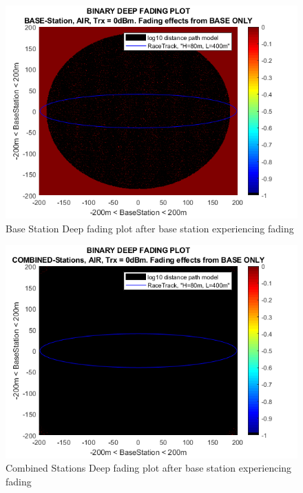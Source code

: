 \begin{figure}[h]
	\centering
	\includegraphics[width=\linewidth]{theory/fading/fig/binaryDeepFading_baseStation_baseOnly.png}
	\caption{Base Station Deep fading plot after base station experiencing fading}
	\label{fig:binaryDeepFading_baseStation_baseOnly}
\end{figure}

\begin{figure}[h]
	\centering
	\includegraphics[width=\linewidth]{theory/fading/fig/binaryDeepFading_combinedStations_baseOnly.png}
	\caption{Combined Stations Deep fading plot after base station experiencing fading}
	\label{fig:binaryDeepFading_combinedStations_baseOnly}
\end{figure}

